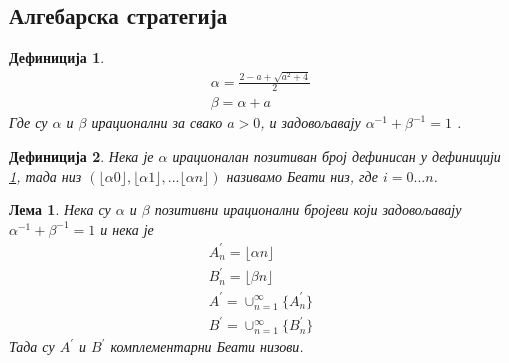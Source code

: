 \documentclass[a4paper]{article}
\newtheorem{lemma}{Лема}
\newtheorem{definition}{Дефиниција}
\begin{document}
\subsection{Алгебарска стратегија}

\begin{definition}
	\label{def:alpha_beta}
	\begin{eqnarray}
		\alpha = \frac{2 - a + \sqrt{a^2 + 4}}{2} \\  
		\beta = \alpha + a
	\end{eqnarray}
	Где су $ \alpha $ и $ \beta $ ирационални за свако $ a > 0 $, и задовољавају $ \alpha^{-1} + \beta^{-1} = 1 $ .
\end{definition}

\begin{definition}
	\label{def:beati_niz}
	Нека је $ \alpha $ ирационалан позитиван број дефинисан у дефиницији \ref{def:alpha_beta}, тада низ $ (\lfloor \alpha 0 \rfloor, \lfloor \alpha 1 \rfloor, ... \lfloor \alpha n \rfloor) $ називамо Беати низ, где $ i = 0...n $.
\end{definition}

\begin{lemma}
	Нека су $ \alpha $ и $ \beta $ позитивни ирационални бројеви који задовољавају $ \alpha^{-1} + \beta^{-1} = 1 $ и нека је 
	\begin{eqnarray} 
		A_{n}^{'} = \lfloor \alpha n \rfloor\\
		B_{n}^{'} = \lfloor \beta n \rfloor\\
		A^{'} = \cup_{n=1}^{\infty}\{A_{n}^{'}\}\\
		B^{'} = \cup_{n=1}^{\infty}\{B_{n}^{'}\}
	\end{eqnarray}
	Тада су $ A^{'} $ и $ B^{'} $ комплементарни Беати низови.
\end{lemma}
\end{document}
